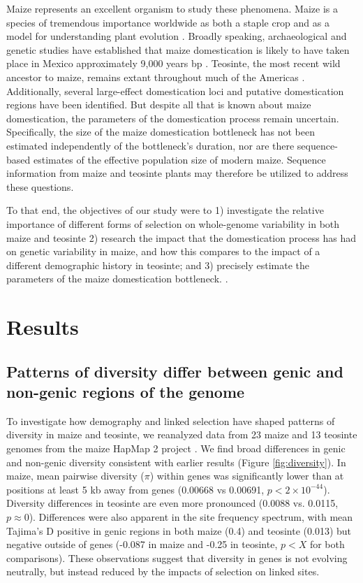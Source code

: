 \documentclass{pnastwo}
\begin{document}
\begin{article}
Maize represents an excellent organism to study these
phenomena. Maize is a species of tremendous importance worldwide as
both a staple crop \cite{shiferaw2011} and as a model for
understanding plant evolution \cite{strable2009}. Broadly speaking, archaeological and genetic studies have
established that maize domestication is likely to have taken place in
 Mexico approximately 9,000 years bp
\cite{smith1995,matsuoka2002}. Teosinte, the most
recent wild ancestor to maize, remains extant throughout much of the
Americas \cite{wilkes1967}. Additionally, several large-effect
domestication loci \cite{doebley1995, wills2013, wang2015} and putative domestication
regions \cite{hufford2012} have been identified. But despite all that is
known about maize domestication, the parameters of the
domestication process remain uncertain. Specifically, the size of the
maize domestication bottleneck has not been estimated independently of
the bottleneck's duration, nor are there sequence-based estimates of the effective
population size of modern maize. Sequence information from maize and
teosinte plants may therefore be utilized to address these questions.

To that end, the objectives of our study were to 1) investigate the
relative importance of different forms of selection on whole-genome
variability in both maize and teosinte 2) research the impact that the
domestication process has had on genetic variability in maize, and how
this compares to the impact of a different demographic history in
teosinte; and 3) precisely estimate the parameters of the
maize domestication bottleneck.  \cite{chia2012}.

\section{Results}
\subsection{Patterns of diversity differ between genic and  non-genic regions of the genome}
To investigate how demography and linked selection have shaped patterns of diversity in maize and teosinte, we reanalyzed data from 23 maize and 13 teosinte genomes from the maize HapMap 2 project \cite{chia2012}.
We find broad differences in genic and non-genic diversity consistent with earlier results  \cite{hufford2012} (Figure \ref{fig:diversity}).  
In maize, mean pairwise diversity ($\pi$) within genes was significantly lower than at positions at least 5 kb away from genes (0.00668 vs 0.00691, $p<2\times 10^{-44}$). 
Diversity differences in teosinte are even more pronounced (0.0088 vs. 0.0115, $p\approx 0$). 
Differences were also apparent in the site frequency spectrum, with mean Tajima's D positive in genic regions in both maize (0.4) and teosinte (0.013) but negative outside of genes (-0.087 in maize and -0.25 in teosinte, $p<X$ for both comparisons).
These observations suggest that diversity in genes is not evolving neutrally, but instead reduced by the impacts of selection on linked sites. 


\end{article}
\end{document}

